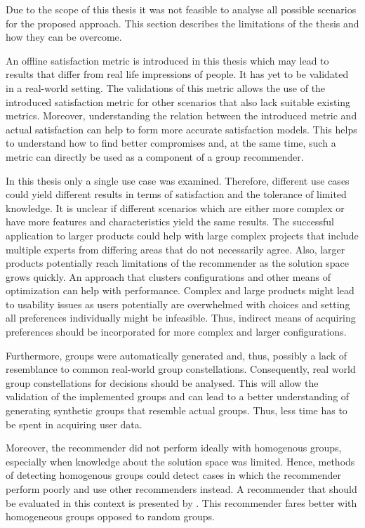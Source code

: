 Due to the scope of this thesis it was not feasible to analyse all possible scenarios for the proposed approach. This section describes the limitations of the thesis and how they can be overcome.

An offline satisfaction metric is introduced in this thesis which may lead to results that differ from real life impressions of people. It has yet to be validated in a real-world setting. The validations of this metric allows the use of the introduced satisfaction metric for other scenarios that also lack suitable existing metrics. Moreover, understanding the relation between the introduced metric and actual satisfaction can help to form more accurate satisfaction models. This helps to understand how to find better compromises and, at the same time, such a metric can directly be used as a component of a group recommender.

In this thesis only a single use case was examined. Therefore, different use cases could yield different results in terms of satisfaction and the tolerance of limited knowledge. It is unclear if different scenarios which are either more complex or have more features and characteristics yield the same results. The successful application to larger products could help with large complex projects that include multiple experts from differing areas that do not necessarily agree. Also, larger products potentially reach limitations of the recommender as the solution space grows quickly. An approach that clusters configurations and other means of optimization can help with performance. Complex and large products might lead to usability issues as users potentially are overwhelmed with choices and setting all preferences individually might be infeasible. Thus, indirect means of acquiring preferences should be incorporated for more complex and larger configurations. 

Furthermore, groups were automatically generated and, thus, possibly a lack of resemblance to common real-world group constellations. Consequently, real world group constellations for decisions should be analysed. This will allow the validation of the implemented groups and can lead to a better understanding of generating synthetic groups that resemble actual groups. Thus, less time has to be spent in acquiring user data.

Moreover, the recommender did not perform ideally with homogenous groups, especially when knowledge about the solution space was limited. Hence, methods of detecting homogenous groups could detect cases in which the recommender perform poorly and use other recommenders instead. A recommender that should be evaluated in this context is presented by \citeauthor{choudharyMulticriteriaGroupRecommender2020} \cite{choudharyMulticriteriaGroupRecommender2020}. This recommender fares better with homogeneous groups opposed to random groups.

